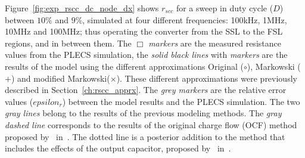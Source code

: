 Figure~\ref{fig:exp_rscc_dc_node_dx} shows $r_{scc}$ for a sweep in duty cycle ($D$) between $10\%$ and $9\%$, simulated at four different frequencies: 100kHz, 1MHz, 10MHz and 100MHz; thus operating the converter from the SSL to the FSL regions, and in between them. The \emph{$\Box$ markers} are the measured resistance values from the PLECS simulation, the \emph{solid black lines} with \emph{markers}  are the results of the model using the different approximations Original ($\circ$), Markowski ($+$) and modified Markowski($\times$). These different approximations were previously described in Section~\ref{ch:rscc_apprx}. The \emph{grey markers} are the relative error values ($epsilon_r$) between the model results and the PLECS simulation.  The two \emph{gray lines} belong to the results of the previous modeling methods. The \emph{gray dashed line}  corresponds to the results of the original charge flow (OCF) method~\cite{95Makowski} proposed  by~\citeauthor{95Makowski} in~\citeyear{95Makowski}. The dotted line is a posterior addition to the method that includes the effects of the output capacitor, proposed by~\citeauthor{2013Breussegem:c_out} in~\cite{2013Breussegem:c_out}.
